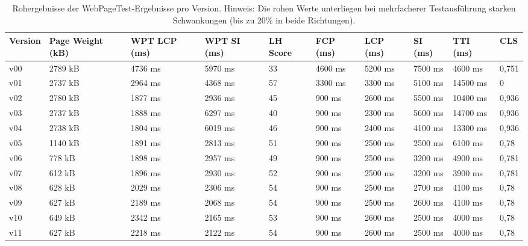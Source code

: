 \documentclass[11pt,a4paper]{article}
\begin{document}
\begin{landscape}
\begin{table}[h]
  \begin{tabular}{|l|l|l|l|l|l|l|l|l|l|}
    \hline
    \textbf{Version} & \textbf{Page Weight (kB)} & \textbf{WPT LCP (ms)} & \textbf{WPT SI (ms)} & \textbf{LH Score} & \textbf{FCP (ms)} & \textbf{LCP (ms)} & \textbf{SI (ms)} & \textbf{TTI (ms)} & \textbf{CLS} \\
    \hline
    v00 & 2789 kB & 4736 ms & 5970 ms & 33 & 4600 ms & 5200 ms & 7500 ms & 4600 ms & 0,751 \\
    \hline
    v01 & 2737 kB & 2964 ms & 4368 ms & 57 & 3300 ms & 3300 ms & 5100 ms & 14500 ms & 0 \\
    \hline
    v02 & 2780 kB & 1877 ms & 2936 ms & 45 & 900 ms & 2600 ms & 5500 ms & 10400 ms & 0,936 \\
    \hline
    v03 & 2737 kB & 1888 ms & 6297 ms & 40 & 900 ms & 2300 ms & 5600 ms & 14700 ms & 0,936 \\
    \hline
    v04 & 2738 kB & 1804 ms & 6019 ms & 46 & 900 ms & 2400 ms & 4100 ms & 13300 ms & 0,936 \\
    \hline
    v05 & 1140 kB & 1891 ms & 2813 ms & 51 & 900 ms & 2500 ms & 2500 ms & 6100 ms & 0,78 \\
    \hline
    v06 & 778 kB & 1898 ms & 2957 ms & 49 & 900 ms & 2500 ms & 3200 ms & 4900 ms & 0,781 \\
    \hline
    v07 & 612 kB & 1896 ms & 2930 ms & 52 & 900 ms & 2500 ms & 3200 ms & 3900 ms & 0,781 \\
    \hline
    v08 & 628 kB & 2029 ms & 2306 ms & 54 & 900 ms & 2500 ms & 2700 ms & 4100 ms & 0,78 \\
    \hline
    v09 & 627 kB & 2189 ms & 2068 ms & 54 & 900 ms & 2500 ms & 2600 ms & 4100 ms & 0,78 \\
    \hline
    v10 & 649 kB & 2342 ms & 2165 ms & 53 & 900 ms & 2600 ms & 2500 ms & 4000 ms & 0,78 \\
    \hline
    v11 & 627 kB & 2218 ms & 2122 ms & 54 & 900 ms & 2600 ms & 2500 ms & 4000 ms & 0,78 \\
    \hline
  \end{tabular}
  \caption{Rohergebnisse der WebPageTest-Ergebnisse pro Version. Hinweis: Die rohen Werte unterliegen bei mehrfacherer Testausführung starken Schwankungen (bis zu 20\% in beide Richtungen).}\label{tab:versionen}
\end{table}


\end{landscape}
\end{document}
